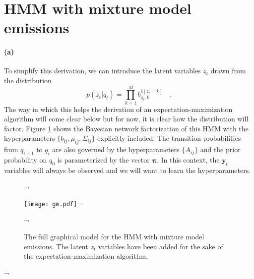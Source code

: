 \documentclass[11pt]{article}
\newcommand{\Fig}[1]{Figure \ref{fig:#1}}
\newcommand{\figlabel}[1]{\label{fig:#1}}
\newcommand{\pr}[1]{\ensuremath{p\left (#1 \right )}}
\newcommand{\bvec}[1]{\ensuremath{\boldsymbol{#1}}}
\begin{document}
\section{HMM with mixture model emissions}

\paragraph{(a)} To simplify this derivation, we can introduce the latent
variables $z_t$ drawn from the distribution
\begin{equation}
    \pr{z_t | q_t} = \prod_{k = 1} ^M b_{q_t, k}^{1[z_t = k]} \quad .
\end{equation}
The way in which this helps the derivation of an expectation-maximization
algorithm will come clear below but for now, it is clear how the distribution
will factor. \Fig{gm} shows the Bayesian network factorization of this HMM
with the hyperparameters $\{b_{ij}, \mu_{ij}, \Sigma_{ij}\}$ explicitly
included. The transition probabilities from $q_{i-1}$ to $q_i$ are also
governed by the hyperparameters $\{A_{ij}\}$ and the prior probability on
$q_0$ is parameterized by the vector $\bvec{\pi}$.
In this context, the $\bvec{y}_t$ variables will always be observed
and we will want to learn the hyperparameters.

\begin{figure}[htbp]¬
    \begin{center}
        \texttt{[image: gm.pdf]}¬
    \end{center}
    \caption{The full graphical model for the HMM with mixture model
        emissions. The latent $z_t$ variables have been added for the sake of
        the expectation-maximization algorithm.\figlabel{gm}}¬
\end{figure}¬
\end{document}
